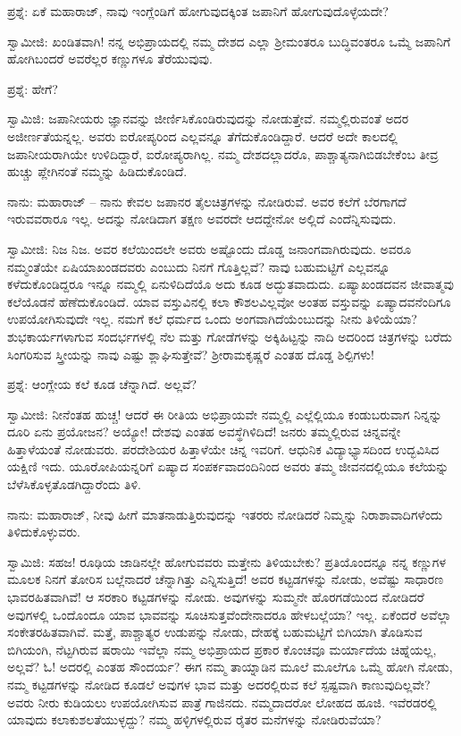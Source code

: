 ಪ್ರಶ್ನೆ: ಏಕೆ ಮಹಾರಾಜ್, ನಾವು ಇಂಗ್ಲೆಂಡಿಗೆ ಹೋಗುವುದಕ್ಕಿಂತ ಜಪಾನಿಗೆ ಹೋಗುವುದೊಳ್ಳೆಯದೇ?

ಸ್ವಾಮೀಜಿ: ಖಂಡಿತವಾಗಿ! ನನ್ನ ಅಭಿಪ್ರಾಯದಲ್ಲಿ ನಮ್ಮ ದೇಶದ ಎಲ್ಲಾ ಶ‍್ರೀಮಂತರೂ ಬುದ್ಧಿವಂತರೂ ಒಮ್ಮೆ ಜಪಾನಿಗೆ ಹೋಗಿಬಂದರೆ ಅವರೆಲ್ಲರ ಕಣ್ಣುಗಳೂ ತೆರೆಯುವುವು.

ಪ್ರಶ್ನೆ: ಹೇಗೆ?

ಸ್ವಾಮಿಜಿ: ಜಪಾನೀಯರು ಜ್ಞಾನವನ್ನು ಜೀರ್ಣಿಸಿಕೊಂಡಿರುವುದನ್ನು ನೋಡುತ್ತೇವೆ. ನಮ್ಮಲ್ಲಿರುವಂತೆ ಅದರ ಅಜೀರ್ಣತೆಯನ್ನಲ್ಲ. ಅವರು ಐರೋಪ್ಯರಿಂದ ಎಲ್ಲವನ್ನೂ ತೆಗೆದುಕೊಂಡಿದ್ದಾರೆ. ಆದರೆ ಅದೇ ಕಾಲದಲ್ಲಿ ಜಪಾನೀಯರಾಗಿಯೇ ಉಳಿದಿದ್ದಾರೆ, ಐರೋಪ್ಯರಾಗಿಲ್ಲ. ನಮ್ಮ ದೇಶದಲ್ಲಾದರೊ, ಪಾಶ್ಚಾತ್ಯನಾಗಿಬಿಡಬೇಕೆಂಬ ತೀವ್ರ ಹುಚ್ಚು ಪ್ಲೇಗಿನಂತೆ ನಮ್ಮನ್ನು ಹಿಡಿದುಕೊಂಡಿದೆ.

ನಾನು: ಮಹಾರಾಜ್ – ನಾನು ಕೇವಲ ಜಪಾನರ ತೈಲಚಿತ್ರಗಳನ್ನು ನೋಡಿರುವೆ. ಅವರ ಕಲೆಗೆ ಬೆರಗಾಗದೆ ಇರುವವರಾರೂ ಇಲ್ಲ. ಅದನ್ನು ನೋಡಿದಾಗ ತಕ್ಷಣ ಅವರದೇ ಆದದ್ದೇನೋ ಅಲ್ಲಿದೆ ಎಂದೆನ್ನಿಸುವುದು.

ಸ್ವಾಮೀಜಿ: ನಿಜ ನಿಜ. ಅವರ ಕಲೆಯಿಂದಲೇ ಅವರು ಅಷ್ಟೊಂದು ದೊಡ್ಡ ಜನಾಂಗವಾಗಿರುವುದು. ಅವರೂ ನಮ್ಮಂತೆಯೇ ಏಷಿಯಾಖಂಡದವರು ಎಂಬುದು ನಿನಗೆ ಗೊತ್ತಿಲ್ಲವೆ? ನಾವು ಬಹುಮಟ್ಟಿಗೆ ಎಲ್ಲವನ್ನೂ ಕಳೆದುಕೊಂಡಿದ್ದರೂ ಇನ್ನೂ ನಮ್ಮಲ್ಲಿ ಏನುಳಿದಿದೆಯೊ ಅದು ಕೂಡ ಅದ್ಭುತವಾದುದು. ಏಷ್ಯಾಖಂಡದವನ ಜೀವಾತ್ಮವು ಕಲೆಯೊಡನೆ ಹೆಣೆದುಕೊಂಡಿದೆ. ಯಾವ ವಸ್ತುವಿನಲ್ಲಿ ಕಲಾ ಕೌಶಲವಿಲ್ಲವೋ ಅಂತಹ ವಸ್ತುವನ್ನು ಏಷ್ಯಾದವನೆಂದಿಗೂ ಉಪಯೋಗಿಸುವುದೇ ಇಲ್ಲ. ನಮಗೆ ಕಲೆ ಧರ್ಮದ ಒಂದು ಅಂಗವಾಗಿದೆಯೆಂಬುದನ್ನು ನೀನು ತಿಳಿಯೆಯಾ? ಶುಭಕಾರ್ಯಗಳಾಗುವ ಸಂದರ್ಭಗಳಲ್ಲಿ ನೆಲ ಮತ್ತು ಗೋಡೆಗಳನ್ನು ಅಕ್ಕಿಹಿಟ್ಟನ್ನು ನಾದಿ ಅದರಿಂದ ಚಿತ್ರಗಳನ್ನು ಬರೆದು ಸಿಂಗರಿಸುವ ಸ್ತ್ರೀಯನ್ನು ನಾವು ಎಷ್ಟು ಶ್ಲಾಘಿಸುತ್ತೇವೆ? ಶ‍್ರೀರಾಮಕೃಷ್ಣರೆ ಎಂತಹ ದೊಡ್ಡ ಶಿಲ್ಪಿಗಳು!

ಪ್ರಶ್ನೆ: ಆಂಗ್ಲೇಯ ಕಲೆ ಕೂಡ ಚೆನ್ನಾಗಿದೆ. ಅಲ್ಲವೆ?

ಸ್ವಾಮೀಜಿ: ನೀನೆಂತಹ ಹುಚ್ಚ! ಆದರೆ ಈ ರೀತಿಯ ಅಭಿಪ್ರಾಯವೇ ನಮ್ಮಲ್ಲಿ ಎಲ್ಲೆಲ್ಲಿಯೂ ಕಂಡುಬರುವಾಗ ನಿನ್ನನ್ನು ದೂರಿ ಏನು ಪ್ರಯೋಜನ? ಅಯ್ಯೋ! ದೇಶವು ಎಂತಹ ಅವಸ್ಥೆಗಿಳಿದಿದೆ! ಜನರು ತಮ್ಮಲ್ಲಿರುವ ಚಿನ್ನವನ್ನೇ ಹಿತ್ತಾಳೆಯಂತೆ ನೋಡುವರು. ಪರದೇಶಿಯರ ಹಿತ್ತಾಳೆಯೇ ಚಿನ್ನ ಇವರಿಗೆ. ಆಧುನಿಕ ವಿದ್ಯಾಭ್ಯಾಸದಿಂದ ಉದ್ಭವಿಸಿದ ಯಕ್ಷಿಣಿ ಇದು. ಯೂರೋಪಿಯನ್ನರಿಗೆ ಏಷ್ಯಾದ ಸಂಪರ್ಕವಾದಂದಿನಿಂದ ಅವರು ತಮ್ಮ ಜೀವನದಲ್ಲಿಯೂ ಕಲೆಯನ್ನು ಬೆಳೆಸಿಕೊಳ್ಳತೊಡಗಿದ್ದಾರೆಂದು ತಿಳಿ.

ನಾನು: ಮಹಾರಾಜ್, ನೀವು ಹೀಗೆ ಮಾತನಾಡುತ್ತಿರುವುದನ್ನು ಇತರರು ನೋಡಿದರೆ ನಿಮ್ಮನ್ನು ನಿರಾಶಾವಾದಿಗಳೆಂದು ತಿಳಿದುಕೊಳ್ಳುವರು.

ಸ್ವಾಮಿಜಿ: ಸಹಜ! ರೂಢಿಯ ಜಾಡಿನಲ್ಲೇ ಹೋಗುವವರು ಮತ್ತೇನು ತಿಳಿಯಬೇಕು? ಪ್ರತಿಯೊಂದನ್ನೂ ನನ್ನ ಕಣ್ಣುಗಳ ಮೂಲಕ ನಿನಗೆ ತೋರಿಸ ಬಲ್ಲೆನಾದರೆ ಚೆನ್ನಾಗಿತ್ತು ಎನ್ನಿಸುತ್ತಿದೆ! ಅವರ ಕಟ್ಟಡಗಳನ್ನು ನೋಡು, ಅವೆಷ್ಟು ಸಾಧಾರಣ ಭಾವರಹಿತವಾಗಿವೆ! ಆ ಸರಕಾರಿ ಕಟ್ಟಡಗಳನ್ನು ನೋಡು. ಅವುಗಳನ್ನು ಸುಮ್ಮನೇ ಹೊರಗಡೆಯಿಂದ ನೋಡಿದರೆ ಅವುಗಳಲ್ಲಿ ಒಂದೊಂದೂ ಯಾವ ಭಾವವನ್ನು ಸೂಚಿಸುತ್ತವೆಂದೇನಾದರೂ ಹೇಳಬಲ್ಲೆಯಾ? ಇಲ್ಲ. ಏಕೆಂದರೆ ಅವೆಲ್ಲಾ ಸಂಕೇತರಹಿತವಾಗಿವೆ. ಮತ್ತೆ, ಪಾಶ್ಚಾತ್ಯರ ಉಡುಪನ್ನು ನೋಡು, ದೇಹಕ್ಕೆ ಬಹುಮಟ್ಟಿಗೆ ಬಿಗಿಯಾಗಿ ತೊಡಿಸುವ ಬಿಗಿಯಂಗಿ, ನೆಟ್ಟಗಿರುವ ಷರಾಯಿ ಇವೆಲ್ಲಾ ನಮ್ಮ ಅಭಿಪ್ರಾಯದ ಪ್ರಕಾರ ಕೊಂಚವೂ ಮರ್ಯಾದೆಯ ಚಿಹ್ನೆಯಲ್ಲ, ಅಲ್ಲವೆ? ಓ! ಅದರಲ್ಲಿ ಎಂತಹ ಸೌಂದರ್ಯ? ಈಗ ನಮ್ಮ ತಾಯ್ನಾಡಿನ ಮೂಲೆ ಮೂಲೆಗೂ ಒಮ್ಮೆ ಹೋಗಿ ನೋಡು, ನಮ್ಮ ಕಟ್ಟಡಗಳನ್ನು ನೋಡಿದ ಕೂಡಲೆ ಅವುಗಳ ಭಾವ ಮತ್ತು ಅದರಲ್ಲಿರುವ ಕಲೆ ಸ್ಪಷ್ಟವಾಗಿ ಕಾಣುವುದಿಲ್ಲವೇ? ಅವರು ನೀರು ಕುಡಿಯಲು ಉಪಯೋಗಿಸುವ ಪಾತ್ರೆ ಗಾಜಿನದು. ನಮ್ಮದಾದರೋ ಲೋಹದ ಹೂಜಿ. ಇವೆರಡರಲ್ಲಿ ಯಾವುದು ಕಲಾಕುಶಲತೆಯುಳ್ಳದ್ದು? ನಮ್ಮ ಹಳ್ಳಿಗಳಲ್ಲಿರುವ ರೈತರ ಮನೆಗಳನ್ನು ನೋಡಿರುವೆಯಾ?

